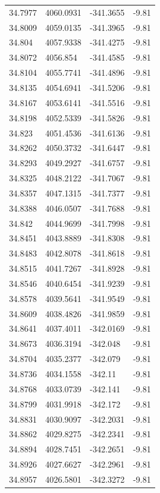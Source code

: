 \begin{table}[H]
\begin{tabular}{llll}
34.7977 & 4060.0931 & -341.3655 & -9.81 \\
34.8009 & 4059.0135 & -341.3965 & -9.81 \\
34.804 & 4057.9338 & -341.4275 & -9.81 \\
34.8072 & 4056.854 & -341.4585 & -9.81 \\
34.8104 & 4055.7741 & -341.4896 & -9.81 \\
34.8135 & 4054.6941 & -341.5206 & -9.81 \\
34.8167 & 4053.6141 & -341.5516 & -9.81 \\
34.8198 & 4052.5339 & -341.5826 & -9.81 \\
34.823 & 4051.4536 & -341.6136 & -9.81 \\
34.8262 & 4050.3732 & -341.6447 & -9.81 \\
34.8293 & 4049.2927 & -341.6757 & -9.81 \\
34.8325 & 4048.2122 & -341.7067 & -9.81 \\
34.8357 & 4047.1315 & -341.7377 & -9.81 \\
34.8388 & 4046.0507 & -341.7688 & -9.81 \\
34.842 & 4044.9699 & -341.7998 & -9.81 \\
34.8451 & 4043.8889 & -341.8308 & -9.81 \\
34.8483 & 4042.8078 & -341.8618 & -9.81 \\
34.8515 & 4041.7267 & -341.8928 & -9.81 \\
34.8546 & 4040.6454 & -341.9239 & -9.81 \\
34.8578 & 4039.5641 & -341.9549 & -9.81 \\
34.8609 & 4038.4826 & -341.9859 & -9.81 \\
34.8641 & 4037.4011 & -342.0169 & -9.81 \\
34.8673 & 4036.3194 & -342.048 & -9.81 \\
34.8704 & 4035.2377 & -342.079 & -9.81 \\
34.8736 & 4034.1558 & -342.11 & -9.81 \\
34.8768 & 4033.0739 & -342.141 & -9.81 \\
34.8799 & 4031.9918 & -342.172 & -9.81 \\
34.8831 & 4030.9097 & -342.2031 & -9.81 \\
34.8862 & 4029.8275 & -342.2341 & -9.81 \\
34.8894 & 4028.7451 & -342.2651 & -9.81 \\
34.8926 & 4027.6627 & -342.2961 & -9.81 \\
34.8957 & 4026.5801 & -342.3272 & -9.81 \\

\end{tabular}
\end{table}
